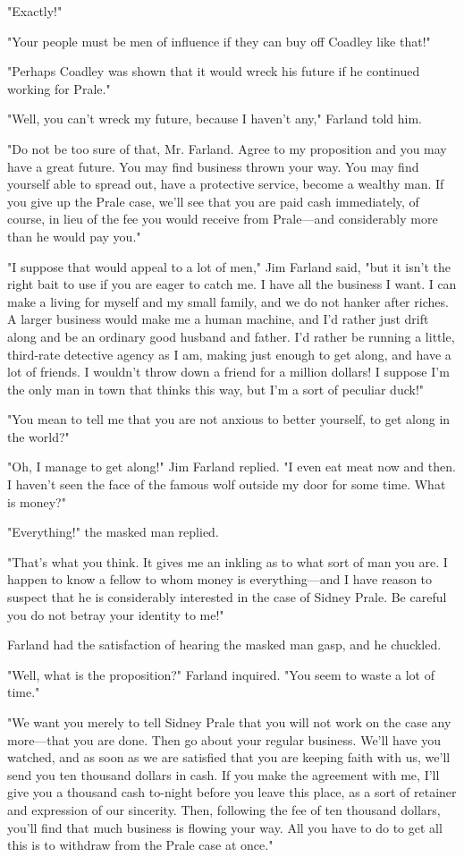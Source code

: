 \documentclass{novel}
\begin{document}
"Exactly!"

"Your people must be men of influence if they can buy off Coadley like that!"

"Perhaps Coadley was shown that it would wreck his future if he continued working for Prale."

"Well, you can't wreck my future, because I haven't any," Farland told him.

"Do not be too sure of that, Mr. Farland. Agree to my proposition and you may have a great future. You may find business thrown your way. You may find yourself able to spread out, have a protective service, become a wealthy man. If you give up the Prale case, we'll see that you are paid cash immediately, of course, in lieu of the fee you would receive from Prale---and considerably more than he would pay you."

"I suppose that would appeal to a lot of men," Jim Farland said, "but it isn't the right bait to use if you are eager to catch me. I have all the business I want. I can make a living for myself and my small family, and we do not hanker after riches. A larger business would make me a human machine, and I'd rather just drift along and be an ordinary good husband and father. I'd rather be running a little, third-rate detective agency as I am, making just enough to get along, and have a lot of friends. I wouldn't throw down a friend for a million dollars! I suppose I'm the only man in town that thinks this way, but I'm a sort of peculiar duck!"

"You mean to tell me that you are not anxious to better yourself, to get along in the world?"

"Oh, I manage to get along!" Jim Farland replied. "I even eat meat now and then. I haven't seen the face of the famous wolf outside my door for some time. What is money?"

"Everything!" the masked man replied.

"That's what you think. It gives me an inkling as to what sort of man you are. I happen to know a fellow to whom money is everything---and I have reason to suspect that he is considerably interested in the case of Sidney Prale. Be careful you do not betray your identity to me!"

Farland had the satisfaction of hearing the masked man gasp, and he chuckled.

"Well, what is the proposition?" Farland inquired. "You seem to waste a lot of time."

"We want you merely to tell Sidney Prale that you will not work on the case any more---that you are done. Then go about your regular business. We'll have you watched, and as soon as we are satisfied that you are keeping faith with us, we'll send you ten thousand dollars in cash. If you make the agreement with me, I'll give you a thousand cash to-night before you leave this place, as a sort of retainer and expression of our sincerity. Then, following the fee of ten thousand dollars, you'll find that much business is flowing your way. All you have to do to get all this is to withdraw from the Prale case at once."
\end{document}

